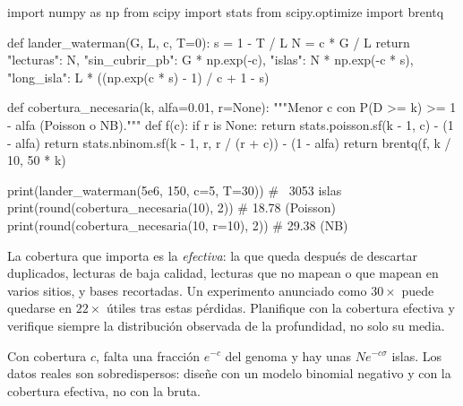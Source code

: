 \begin{codigo}[profundidad.py]
import numpy as np
from scipy import stats
from scipy.optimize import brentq

def lander_waterman(G, L, c, T=0):
    s = 1 - T / L
    N = c * G / L
    return {"lecturas": N,
            "sin_cubrir_pb": G * np.exp(-c),
            "islas": N * np.exp(-c * s),
            "long_isla": L * ((np.exp(c * s) - 1) / c + 1 - s)}

def cobertura_necesaria(k, alfa=0.01, r=None):
    """Menor c con P(D >= k) >= 1 - alfa (Poisson o NB)."""
    def f(c):
        if r is None:
            return stats.poisson.sf(k - 1, c) - (1 - alfa)
        return stats.nbinom.sf(k - 1, r, r / (r + c)) - (1 - alfa)
    return brentq(f, k / 10, 50 * k)

print(lander_waterman(5e6, 150, c=5, T=30))    # ~3053 islas
print(round(cobertura_necesaria(10), 2))        # 18.78 (Poisson)
print(round(cobertura_necesaria(10, r=10), 2))  # 29.38 (NB)
\end{codigo}

\begin{cuidado}
La cobertura que importa es la \emph{efectiva}: la que queda después de descartar duplicados, lecturas de baja calidad, lecturas que no mapean o que mapean en varios sitios, y bases recortadas. Un experimento anunciado como $30\times$ puede quedarse en $22\times$ útiles tras estas pérdidas. Planifique con la cobertura efectiva y verifique siempre la distribución observada de la profundidad, no solo su media.
\end{cuidado}

\begin{ideaclave}
Con cobertura $c$, falta una fracción $e^{-c}$ del genoma y hay unas $Ne^{-c\sigma}$ islas. Los datos reales son sobredispersos: diseñe con un modelo binomial negativo y con la cobertura efectiva, no con la bruta.
\end{ideaclave}

